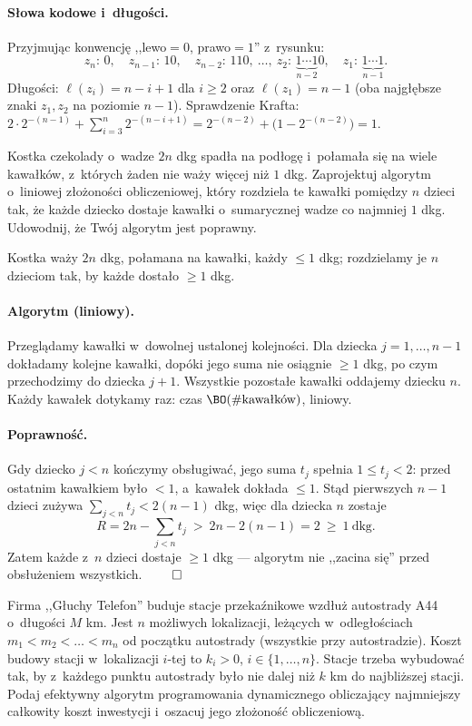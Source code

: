 \paragraph{Słowa kodowe i~długości.}
Przyjmując konwencję ,,lewo${}=0$, prawo${}=1$'' z~rysunku:
\[
	z_n\!:\,0,\quad z_{n-1}\!:\,10,\quad z_{n-2}\!:\,110,\ \dots,\
	z_2\!:\,\underbrace{1\cdots1}_{n-2}0,\quad z_1\!:\,\underbrace{1\cdots1}_{n-1}.
\]
Długości: $\ell(z_i)=n-i+1$ dla $i\geq 2$ oraz $\ell(z_1)=n-1$ (oba najgłębsze
znaki $z_1,z_2$ na poziomie $n-1$). Sprawdzenie Krafta:
$2\cdot 2^{-(n-1)}+\sum_{i=3}^{n} 2^{-(n-i+1)}=2^{-(n-2)}+\big(1-2^{-(n-2)}\big)=1$.

\clearpage
\begin{zadanie}
	Kostka czekolady o~wadze $2n$ dkg spadła na podłogę i~połamała się na wiele
	kawałków, z~których żaden nie waży więcej niż $1$ dkg. Zaprojektuj algorytm
	o~liniowej złożoności obliczeniowej, który rozdziela te kawałki pomiędzy $n$
	dzieci tak, że każde dziecko dostaje kawałki o~sumarycznej wadze co najmniej
	$1$ dkg. Udowodnij, że Twój algorytm jest poprawny.
\end{zadanie}

Kostka waży $2n$ dkg, połamana na kawałki, każdy $\leq 1$ dkg; rozdzielamy je
$n$ dzieciom tak, by każde dostało $\geq 1$ dkg.

\paragraph{Algorytm (liniowy).}
Przeglądamy kawałki w~dowolnej ustalonej kolejności. Dla dziecka
$j=1,\dots,n-1$ dokładamy kolejne kawałki, dopóki jego suma nie osiągnie $\geq 1$
dkg, po czym przechodzimy do dziecka $j+1$. Wszystkie pozostałe kawałki oddajemy
dziecku $n$. Każdy kawałek dotykamy raz: czas $\BO(\#\text{kawałków})$, liniowy.

\paragraph{Poprawność.}
Gdy dziecko $j<n$ kończymy obsługiwać, jego suma $t_j$ spełnia $1\leq t_j<2$:
przed ostatnim kawałkiem było $<1$, a~kawałek dokłada $\leq 1$. Stąd pierwszych
$n-1$ dzieci zużywa $\sum_{j<n} t_j<2(n-1)$ dkg, więc dla dziecka $n$ zostaje
\[
	R=2n-\sum_{j<n} t_j\ >\ 2n-2(n-1)=2\ \geq\ 1\ \text{dkg}.
\]
Zatem każde z~$n$ dzieci dostaje $\geq 1$ dkg --- algorytm nie ,,zacina się''
przed obsłużeniem wszystkich. $\qed$

\clearpage
\begin{zadanie}
	Firma ,,Głuchy Telefon'' buduje stacje przekaźnikowe wzdłuż autostrady A44
	o~długości $M$ km. Jest $n$ możliwych lokalizacji, leżących w~odległościach
	$m_1<m_2<\dots<m_n$ od początku autostrady (wszystkie przy autostradzie).
	Koszt budowy stacji w~lokalizacji $i$-tej to $k_i>0$, $i\in\{1,\dots,n\}$.
	Stacje trzeba wybudować tak, by z~każdego punktu autostrady było nie dalej niż
	$k$ km do najbliższej stacji. Podaj efektywny algorytm programowania
	dynamicznego obliczający najmniejszy całkowity koszt inwestycji i~oszacuj jego
	złożoność obliczeniową.
\end{zadanie}

